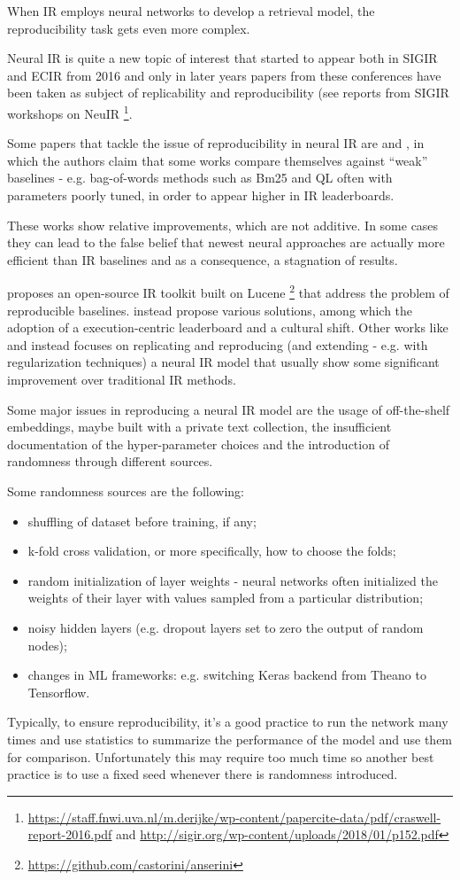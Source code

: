 When IR employs neural networks to develop a retrieval model, the reproducibility task gets even more complex.

Neural IR is quite a new topic of interest that started to appear both in SIGIR and ECIR from 2016 and only in later years papers from these conferences have been taken as subject of replicability and reproducibility (see reports from SIGIR workshops on NeuIR \footnote{\url{https://staff.fnwi.uva.nl/m.derijke/wp-content/papercite-data/pdf/craswell-report-2016.pdf} and \url{http://sigir.org/wp-content/uploads/2018/01/p152.pdf}}.

Some papers that tackle the issue of reproducibility in neural IR are \cite{neurhype} and \cite{anserini}, in which the authors claim that some works compare themselves against ``weak'' baselines - e.g. bag-of-words methods such as Bm25 and QL often with parameters poorly tuned, in order to appear higher in IR leaderboards.

These works show relative improvements, which are not additive. In some cases they can lead to the false belief that newest neural approaches are actually more efficient than IR baselines and as a consequence, a stagnation of results.

\cite{anserini} proposes an open-source IR toolkit built on Lucene \footnote{\url{https://github.com/castorini/anserini}} that address the problem of reproducible baselines. \cite{neurhype} instead propose various solutions, among which the adoption of a execution-centric leaderboard and a cultural shift. Other works like \cite{reproconvneurir} and \cite{axiomneuir} instead focuses on replicating and reproducing (and extending - e.g. with regularization techniques) a neural IR model that usually show some significant improvement over traditional IR methods.

Some major issues in reproducing a neural IR model are the usage of off-the-shelf embeddings, maybe built with a private text collection, the insufficient documentation of the hyper-parameter choices and the introduction of randomness through different sources.

Some randomness sources are the following:

\begin{itemize}
\item shuffling of dataset before training, if any;
\item k-fold cross validation, or more specifically, how to choose the folds;
\item random initialization of layer weights - neural networks often initialized the weights of their
layer with values sampled from a particular distribution;
\item noisy hidden layers (e.g. dropout layers set to zero the output of random nodes);
\item changes in ML frameworks: e.g. switching Keras backend from Theano to Tensorflow.
\end{itemize}

Typically, to ensure reproducibility, it's a good practice to run the network many times and use statistics to summarize the performance of the model and use them for comparison. Unfortunately this may require too much time so another best practice is to use a fixed seed whenever there is randomness introduced.
